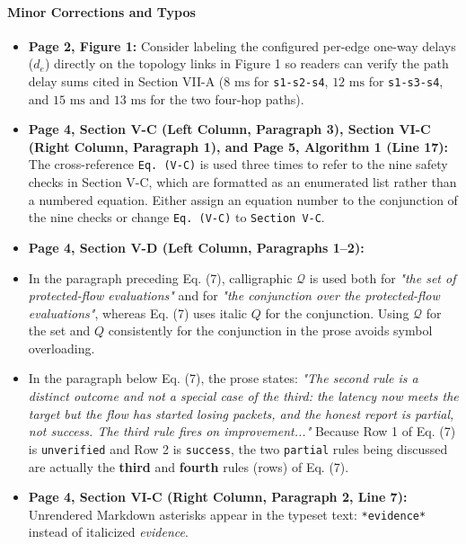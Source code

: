\documentclass[11pt,a4paper]{article}
\begin{document}
\paragraph{Minor Corrections and Typos}
\begin{itemize}[leftmargin=1.8em,itemsep=2pt]
\item \textbf{Page 2, Figure 1:} Consider labeling the configured per-edge one-way delays ($d_e$) directly on the topology links in Figure 1 so readers can verify the path delay sums cited in Section VII-A ($8\text{ ms}$ for \texttt{s1-s2-s4}, $12\text{ ms}$ for \texttt{s1-s3-s4}, and $15\text{ ms}$ and $13\text{ ms}$ for the two four-hop paths).
\end{itemize}
\begin{itemize}[leftmargin=1.8em,itemsep=2pt]
\item \textbf{Page 4, Section V-C (Left Column, Paragraph 3), Section VI-C (Right Column, Paragraph 1), and Page 5, Algorithm 1 (Line 17):} The cross-reference \texttt{Eq. (V-C)} is used three times to refer to the nine safety checks in Section V-C, which are formatted as an enumerated list rather than a numbered equation. Either assign an equation number to the conjunction of the nine checks or change \texttt{Eq. (V-C)} to \texttt{Section V-C}.
\end{itemize}
\begin{itemize}[leftmargin=1.8em,itemsep=2pt]
\item \textbf{Page 4, Section V-D (Left Column, Paragraphs 1–2):}
\item In the paragraph preceding Eq. (7), calligraphic $\mathcal{Q}$ is used both for \emph{"the set of protected-flow evaluations"} and for \emph{"the conjunction over the protected-flow evaluations"}, whereas Eq. (7) uses italic $Q$ for the conjunction. Using $\mathcal{Q}$ for the set and $Q$ consistently for the conjunction in the prose avoids symbol overloading.
\item In the paragraph below Eq. (7), the prose states: \emph{"The second rule is a distinct outcome and not a special case of the third: the latency now meets the target but the flow has started losing packets, and the honest report is partial, not success. The third rule fires on improvement..."} Because Row 1 of Eq. (7) is \texttt{unverified} and Row 2 is \texttt{success}, the two \texttt{partial} rules being discussed are actually the \textbf{third} and \textbf{fourth} rules (rows) of Eq. (7).
\end{itemize}
\begin{itemize}[leftmargin=1.8em,itemsep=2pt]
\item \textbf{Page 4, Section VI-C (Right Column, Paragraph 2, Line 7):} Unrendered Markdown asterisks appear in the typeset text: \texttt{*evidence*} instead of italicized \emph{evidence}.
\end{itemize}
\end{document}

